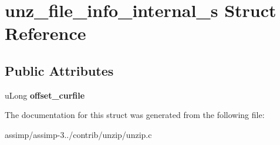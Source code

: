 \hypertarget{structunz__file__info__internal__s}{\section{unz\+\_\+file\+\_\+info\+\_\+internal\+\_\+s Struct Reference}
\label{structunz__file__info__internal__s}
}
\subsection*{Public Attributes}
\begin{DoxyCompactItemize}
\item 
\hypertarget{structunz__file__info__internal__s_a23d3a1c3584888bdf066d7bfed95f62e}{u\+Long {\bfseries offset\+\_\+curfile}}\label{structunz__file__info__internal__s_a23d3a1c3584888bdf066d7bfed95f62e}

\end{DoxyCompactItemize}


The documentation for this struct was generated from the following file\+:\begin{DoxyCompactItemize}
\item 
assimp/assimp-\/3../contrib/unzip/unzip.\+c\end{DoxyCompactItemize}
